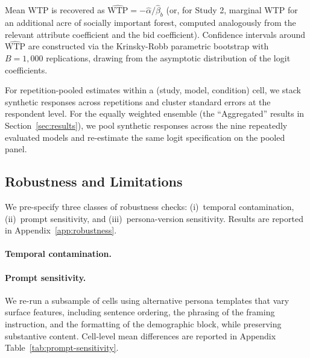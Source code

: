 \documentclass[12pt]{article}
\begin{document}
Mean WTP is recovered as $\widehat{\text{WTP}} = -\hat{\alpha}/\hat{\beta}_b$
(or, for Study 2, marginal WTP for an additional acre of socially important
forest, computed analogously from the relevant attribute coefficient and
the bid coefficient). Confidence intervals around $\widehat{\text{WTP}}$
are constructed via the Krinsky-Robb parametric bootstrap with
$B = 1{,}000$ replications, drawing from the asymptotic
distribution of the logit coefficients.

For repetition-pooled estimates within a (study, model, condition) cell,
we stack synthetic responses across repetitions and cluster standard
errors at the respondent level. For the equally weighted ensemble (the ``Aggregated'' results in
Section~\ref{sec:results}), we pool synthetic responses across the nine
repeatedly evaluated models and re-estimate the same logit specification
on the pooled panel.

\subsection{Robustness and Limitations}\label{sec:methods-robustness}

We pre-specify three classes of robustness checks: (i)~temporal
contamination, (ii)~prompt sensitivity, and (iii)~persona-version
sensitivity. Results are reported in Appendix~\ref{app:robustness}.

\paragraph{Temporal contamination.} 

\paragraph{Prompt sensitivity.} We re-run a subsample of cells using
alternative persona templates that vary surface features, including
sentence ordering, the phrasing of the framing instruction, and the
formatting of the demographic block, while preserving substantive
content. Cell-level mean differences are reported in Appendix
Table~\ref{tab:prompt-sensitivity}.
\end{document}
